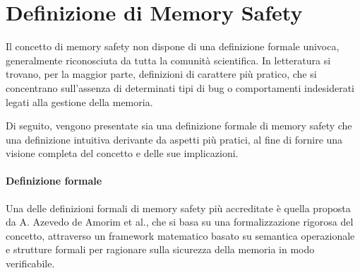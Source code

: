 \section{Definizione di Memory Safety}
\label{sec:memory_safety}

Il concetto di memory safety non dispone di una definizione formale univoca,
generalmente riconosciuta da tutta la comunità scientifica. In letteratura si trovano,
per la maggior parte, definizioni di carattere più pratico, che si concentrano
sull'assenza di determinati tipi di bug o comportamenti indesiderati legati alla
gestione della memoria.

Di seguito, vengono presentate sia una definizione formale di memory safety che una
definizione intuitiva derivante da aspetti più pratici, al fine di fornire una
visione completa del concetto e delle sue implicazioni.

\paragraph{Definizione formale}

Una delle definizioni formali di memory safety più accreditate è quella proposta
da A. Azevedo de Amorim et al.\cite{meaning_memory_safety}, che si basa su una
formalizzazione rigorosa del concetto, attraverso un framework matematico basato
su semantica operazionale e strutture formali per ragionare sulla sicurezza della
memoria in modo verificabile.

